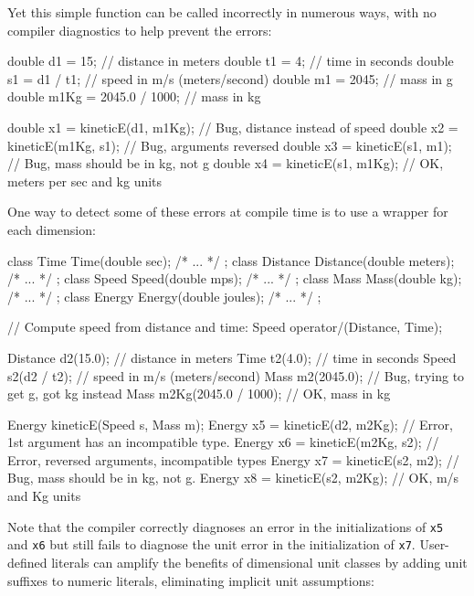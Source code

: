 \noindent Yet this simple function can be called incorrectly in numerous ways,
with no compiler diagnostics to help prevent the errors:

\begin{emcppslisting}
double d1   = 15;             // distance in meters
double t1   = 4;              // time in seconds
double s1   = d1 / t1;        // speed in m/s (meters/second)
double m1   = 2045;           // mass in g
double m1Kg = 2045.0 / 1000;  // mass in kg

double x1 = kineticE(d1, m1Kg);  // Bug, distance instead of speed
double x2 = kineticE(m1Kg, s1);  // Bug, arguments reversed
double x3 = kineticE(s1, m1);    // Bug, mass should be in kg, not g
double x4 = kineticE(s1, m1Kg);  // OK, meters per sec and kg units
\end{emcppslisting}
    
\noindent One way to detect some of these errors at compile time is to use a
wrapper for each dimension:

\begin{emcppslisting}
class Time     { Time(double sec);        /* ... */ };
class Distance { Distance(double meters); /* ... */ };
class Speed    { Speed(double mps);       /* ... */ };
class Mass     { Mass(double kg);         /* ... */ };
class Energy   { Energy(double joules);   /* ... */ };

// Compute speed from distance and time:
Speed operator/(Distance, Time);

Distance d2(15.0);             // distance in meters
Time     t2(4.0);              // time in seconds
Speed    s2(d2 / t2);          // speed in m/s (meters/second)
Mass     m2(2045.0);           // Bug, trying to get g, got kg instead
Mass     m2Kg(2045.0 / 1000);  // OK, mass in kg

Energy kineticE(Speed s, Mass m);
Energy x5 = kineticE(d2, m2Kg); // Error, 1st argument has an incompatible type.
Energy x6 = kineticE(m2Kg, s2); // Error, reversed arguments, incompatible types
Energy x7 = kineticE(s2, m2);   // Bug, mass should be in kg, not g.
Energy x8 = kineticE(s2, m2Kg); // OK, m/s and Kg units
\end{emcppslisting}
    
\noindent Note that the compiler correctly diagnoses an error in the
initializations of \lstinline!x5! and \lstinline!x6! but still fails to
diagnose the unit error in the initialization of \lstinline!x7!.
User-defined literals can amplify the benefits of dimensional unit
classes by adding unit suffixes to numeric literals, eliminating
implicit unit assumptions:


